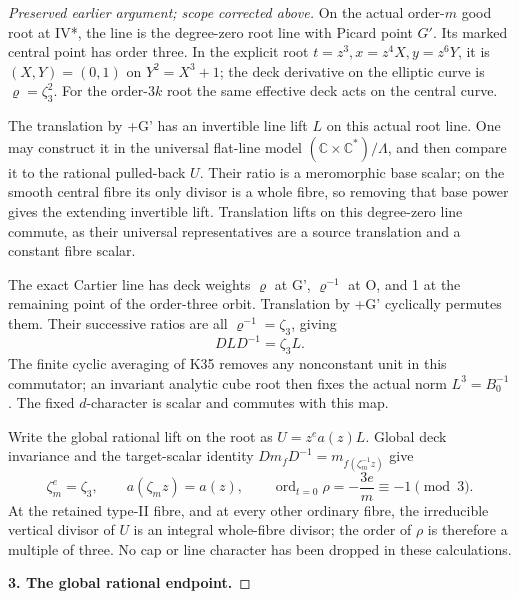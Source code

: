 \begin{proof}[Preserved earlier argument; scope corrected above]
On the actual order-\(m\) good root at IV*, the line is the degree-zero
root line with Picard point \(G'\). Its marked central point has order
three. In the explicit root \(t=z^3,x=z^4X,y=z^6Y\), it is
\((X,Y)=(0,1)\) on \(Y^2=X^3+1\); the deck derivative on the
elliptic curve is \(\varrho=\zeta_3^2\). For the order-\(3k\)
root the same effective deck acts on the central curve.

The translation by +G' has an invertible line lift \(L\) on this actual
root line. One may construct it in the universal flat-line model
\((\mathbb C\times\mathbb C^*)/\Lambda\), and then compare it to
the rational pulled-back \(U\). Their ratio is a meromorphic base scalar;
on the smooth central fibre its only divisor is a whole fibre, so removing
that base power gives the extending invertible lift. Translation lifts on
this degree-zero line commute, as their universal representatives are a
source translation and a constant fibre scalar.

The exact Cartier line has deck weights \(\varrho\) at G',
\(\varrho^{-1}\) at O, and 1 at the remaining point of the order-three
orbit. Translation by +G' cyclically permutes them. Their successive ratios
are all \(\varrho^{-1}=\zeta_3\), giving
\[
 DLD^{-1}=\zeta_3 L.                                             \tag{P3K.37.6}
\]
The finite cyclic averaging of K35 removes any nonconstant unit in this
commutator; an invariant analytic cube root then fixes the actual norm
\(L^3=B_0^{-1}\). The fixed \(d\)-character is scalar and commutes
with this map.

Write the global rational lift on the root as
\(U=z^e a(z)L\). Global deck invariance and the target-scalar identity
\(D m_f D^{-1}=m_{f(\zeta_m^{-1}z)}\) give
\[
 \zeta_m^e=\zeta_3,\qquad a(\zeta_mz)=a(z),\qquad
 \operatorname{ord}_{t=0}\rho=-\frac{3e}{m}\equiv-1\pmod3.
                                                                    \tag{P3K.37.7}
\]
At the retained type-II fibre, and at every other ordinary fibre, the
irreducible vertical divisor of \(U\) is an integral whole-fibre divisor;
the order of \(\rho\) is therefore a multiple of three. No cap or line
character has been dropped in these calculations.

\par\medskip\noindent\textbf{3. The global rational endpoint.}\enspace


\end{proof}
